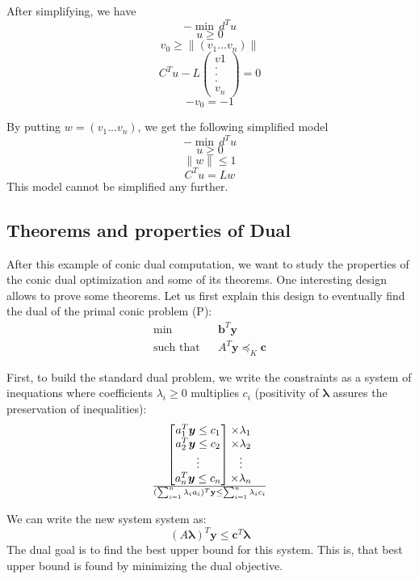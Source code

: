  After simplifying, we have \\
 $$-\min \, d^Tu$$
 $$u \geq 0$$
 $$v_0 \geq \parallel (v_1 ... v_n) \parallel$$
 $$C^Tu - L\begin{pmatrix}
 v1\\ 
 .\\
 .\\
 .\\
 v_n
 \end{pmatrix} = 0 $$
 $$-v_0=-1$$
 
 By putting $w=(v_1 ... v_n)$, we get the following simplified model 
$$-\min \, d^Tu$$
$$u \geq 0$$
$$\parallel w \parallel \leq 1$$
$$C^Tu = Lw$$
This model cannot be simplified any further.


\subsection{Theorems and properties of Dual}
After this example of conic dual computation, we want to study the properties of the conic dual optimization and some of its theorems. One interesting design allows to prove some theorems. Let us first explain this design to eventually find the dual of the primal conic problem (P):
\begin{eqnarray*}
 \min & &\textbf{b}^T\textbf{y}\\
 \text{such that} & & A^T\textbf{y}\preceq_K \textbf{c}
\end{eqnarray*}

First, to build the standard dual problem, we write the constraints as a system of inequations where coefficients $\lambda_i \geq 0$ multiplies $c_i$ (positivity of $\boldsymbol{\lambda}$ assures the preservation of inequalities):
\[\begin{bmatrix}
 a_1^T \boldsymbol{y} \leq c_1\\
 a_2^T \boldsymbol{y} \leq c_2\\
 \vdots\\
 a_n^T \boldsymbol{y} \leq c_n
\end{bmatrix}
\begin{matrix}
 \times \lambda_1\\
 \times \lambda_2\\
 \vdots\\
 \times \lambda_n
\end{matrix}
\over
(\sum_{i=1}^{n}\lambda_i a_i)^T \textbf{y} \leq \sum_{i=1}^{n}\lambda_i c_i\]

We can write the new system system as:
\[(A\boldsymbol{\lambda})^T \boldsymbol{y} \leq \boldsymbol{c}^T \boldsymbol{\lambda}
\]
The dual goal is to find the best upper bound for this system. This is, that best upper bound is found by minimizing the dual objective.\\

